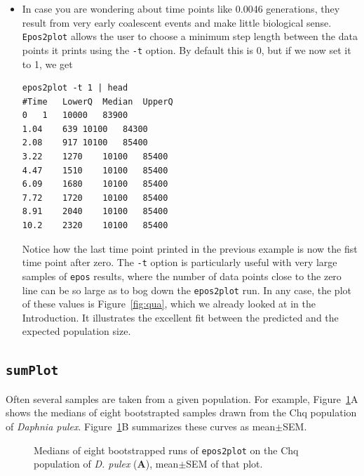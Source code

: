 \documentclass[a4paper]{article}
\newcommand{\ty}{\texttt}
\begin{document}
\begin{itemize}
\item In case you are wondering about time points like 0.0046
  generations, they result from very early coalescent events and make
  little biological sense. \ty{Epos2plot} allows the user to choose a
  minimum step length between the data points it prints using the
  \ty{-t} option. By default this is 0, but if we now set it to 1, we
  get
\begin{verbatim}
epos2plot -t 1 | head
#Time	LowerQ	Median	UpperQ
0	1	10000	83900
1.04	639	10100	84300
2.08	917	10100	85400
3.22	1270	10100	85400
4.47	1510	10100	85400
6.09	1680	10100	85400
7.72	1720	10100	85400
8.91	2040	10100	85400
10.2	2320	10100	85400
\end{verbatim}
Notice how the last time point printed in the previous example is now
the fist time point after zero. The \ty{-t} option is particularly
useful with very large samples of \ty{epos} results, where the number
of data points close to the zero line can be so large as to bog down
the \ty{epos2plot} run.  In any case, the plot of these values is
Figure~\ref{fig:qua}, which we already looked at in the
Introduction. It illustrates the excellent fit between the predicted
and the expected population size.
\end{itemize}
\subsection{\ty{sumPlot}}
Often several samples are taken from a given population. For example,
Figure~\ref{fig:chq}A shows the medians of eight bootstrapted samples
drawn from the Chq population of \textit{Daphnia
  pulex}. Figure~\ref{fig:chq}B summarizes these curves as
mean$\pm$SEM.

\begin{figure}
  \begin{center}
  \end{center}
  \caption{Medians of eight bootstrapped runs of \ty{epos2plot} on the
    Chq population of \textit{D. pulex} (\textbf{A}), mean$\pm$SEM of
    that plot.}\label{fig:chq}
\end{figure}



\end{document}
